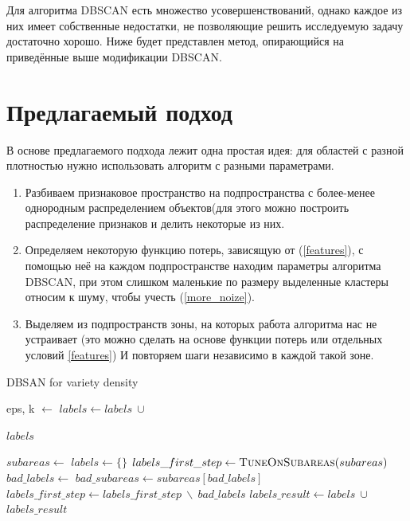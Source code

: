 \documentclass[12pt,fleqn]{article}
\begin{document}
Для алгоритма DBSCAN есть множество усовершенствований, однако каждое из них имеет собственные недостатки, не позволяющие решить исследуемую задачу достаточно хорошо. Ниже будет представлен метод, опирающийся на приведённые выше модификации  DBSCAN.

\section{Предлагаемый подход}
В основе предлагаемого подхода лежит одна простая идея: для областей с разной плотностью нужно использовать алгоритм с разными параметрами.
\begin{enumerate}
    \item Разбиваем признаковое пространство на подпространства с более-менее однородным распределением объектов(для этого можно построить распределение признаков и делить некоторые из них.
    \item  Определяем некоторую функцию потерь, зависящую от (\ref{features}), с помощью неё на каждом подпространстве находим параметры алгоритма DBSCAN, при этом слишком маленькие по размеру выделенные кластеры относим к шуму, чтобы учесть (\ref{more_noize}).
    \item Выделяем из подпространств зоны, на которых работа алгоритма нас не устраивает (это можно сделать на основе функции потерь или отдельных условий \ref{features}) И повторяем шаги независимо в каждой такой зоне.
\end{enumerate}

\newpage

\begin{algorithm}
\caption{DBSAN for variety density}\label{alg:Example}
\begin{algorithmic}

    \State eps, k  $\gets$ 
    \State $labels \gets labels ~ \cup$ 
\EndFor

\State \Return $labels$
\EndFunction

\State $subareas \gets$ 
\State $labels \gets \{\}$
\State $labels\_first\_step \gets \Call{TuneOnSubareas}{subareas}$
\State $bad\_labels \gets$ 
\State $bad\_subareas \gets subareas[ bad\_labels ]$
\State $labels\_first\_step \gets labels\_first\_step~\backslash~bad\_labels$
\State $labels\_result \gets labels ~ \cup$ 
\State \Return $labels\_result$

\end{algorithmic}
\end{algorithm}
\end{document}
